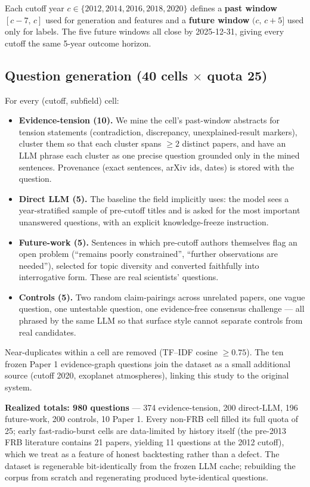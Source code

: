 \documentclass[11pt]{article}
\begin{document}
Each cutoff year $c \in \{2012, 2014, 2016, 2018, 2020\}$ defines a
\textbf{past window} $[c-7,\, c]$ used for generation and features and a
\textbf{future window} $(c,\, c+5]$ used only for labels. The five future
windows all close by 2025-12-31, giving every cutoff the same 5-year
outcome horizon.

\subsection{Question generation (40 cells $\times$ quota 25)}

For every (cutoff, subfield) cell:

\begin{itemize}
  \item \textbf{Evidence-tension (10).} We mine the cell's past-window
    abstracts for tension statements (contradiction, discrepancy,
    unexplained-result markers), cluster them so that each cluster spans
    $\geq 2$ distinct papers, and have an LLM phrase each cluster as one
    precise question grounded only in the mined sentences. Provenance
    (exact sentences, arXiv ids, dates) is stored with the question.
  \item \textbf{Direct LLM (5).} The baseline the field implicitly uses:
    the model sees a year-stratified sample of pre-cutoff titles and is
    asked for the most important unanswered questions, with an explicit
    knowledge-freeze instruction.
  \item \textbf{Future-work (5).} Sentences in which pre-cutoff authors
    themselves flag an open problem (``remains poorly constrained'',
    ``further observations are needed''), selected for topic diversity
    and converted faithfully into interrogative form. These are real
    scientists' questions.
  \item \textbf{Controls (5).} Two random claim-pairings across unrelated
    papers, one vague question, one untestable question, one
    evidence-free consensus challenge --- all phrased by the same LLM so
    that surface style cannot separate controls from real candidates.
\end{itemize}

Near-duplicates within a cell are removed (TF--IDF cosine $\geq 0.75$).
The ten frozen Paper 1 evidence-graph questions join the dataset as a
small additional source (cutoff 2020, exoplanet atmospheres), linking
this study to the original system.

\textbf{Realized totals: 980 questions} --- 374 evidence-tension, 200
direct-LLM, 196 future-work, 200 controls, 10 Paper 1. Every non-FRB cell
filled its full quota of 25; early fast-radio-burst cells are
data-limited by history itself (the pre-2013 FRB literature contains 21
papers, yielding 11 questions at the 2012 cutoff), which we treat as a
feature of honest backtesting rather than a defect. The dataset is
regenerable bit-identically from the frozen LLM cache; rebuilding the
corpus from scratch and regenerating produced byte-identical questions.
\end{document}

